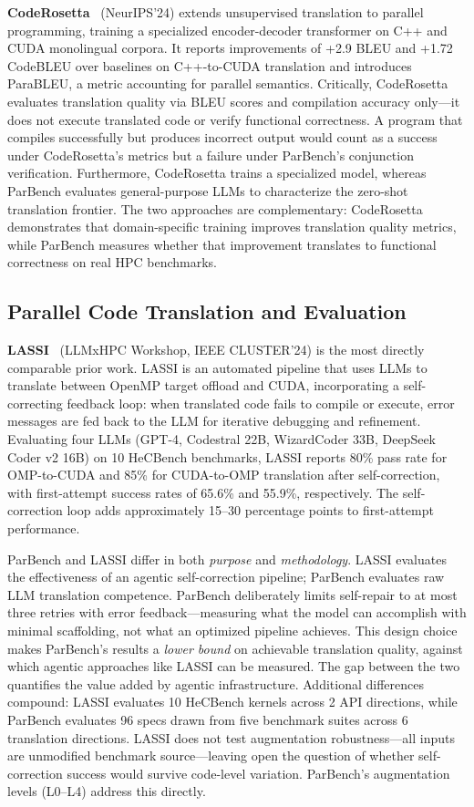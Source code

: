 \documentclass[conference]{IEEEtran}
\begin{document}
\textbf{CodeRosetta}~\cite{CodeRosetta2024} (NeurIPS'24) extends unsupervised translation to parallel programming, training a specialized encoder-decoder transformer on C++ and CUDA monolingual corpora. It reports improvements of +2.9 BLEU and +1.72 CodeBLEU over baselines on C++-to-CUDA translation and introduces ParaBLEU, a metric accounting for parallel semantics. Critically, CodeRosetta evaluates translation quality via BLEU scores and compilation accuracy only---it does not execute translated code or verify functional correctness. A program that compiles successfully but produces incorrect output would count as a success under CodeRosetta's metrics but a failure under ParBench's conjunction verification. Furthermore, CodeRosetta trains a specialized model, whereas ParBench evaluates general-purpose LLMs to characterize the zero-shot translation frontier. The two approaches are complementary: CodeRosetta demonstrates that domain-specific training improves translation quality metrics, while ParBench measures whether that improvement translates to functional correctness on real HPC benchmarks.

\subsection{Parallel Code Translation and Evaluation}
\label{sec:parallel-translation}

\textbf{LASSI}~\cite{LASSI2024} (LLMxHPC Workshop, IEEE CLUSTER'24) is the most directly comparable prior work. LASSI is an automated pipeline that uses LLMs to translate between OpenMP target offload and CUDA, incorporating a self-correcting feedback loop: when translated code fails to compile or execute, error messages are fed back to the LLM for iterative debugging and refinement. Evaluating four LLMs (GPT-4, Codestral 22B, WizardCoder 33B, DeepSeek Coder v2 16B) on 10 HeCBench benchmarks, LASSI reports 80\% pass rate for OMP-to-CUDA and 85\% for CUDA-to-OMP translation after self-correction, with first-attempt success rates of 65.6\% and 55.9\%, respectively. The self-correction loop adds approximately 15--30 percentage points to first-attempt performance.

ParBench and LASSI differ in both \emph{purpose} and \emph{methodology}. LASSI evaluates the effectiveness of an agentic self-correction pipeline; ParBench evaluates raw LLM translation competence. ParBench deliberately limits self-repair to at most three retries with error feedback---measuring what the model can accomplish with minimal scaffolding, not what an optimized pipeline achieves. This design choice makes ParBench's results a \emph{lower bound} on achievable translation quality, against which agentic approaches like LASSI can be measured. The gap between the two quantifies the value added by agentic infrastructure. Additional differences compound: LASSI evaluates 10 HeCBench kernels across 2 API directions, while ParBench evaluates 96 specs drawn from five benchmark suites across 6 translation directions. LASSI does not test augmentation robustness---all inputs are unmodified benchmark source---leaving open the question of whether self-correction success would survive code-level variation. ParBench's augmentation levels (L0--L4) address this directly.
\end{document}
